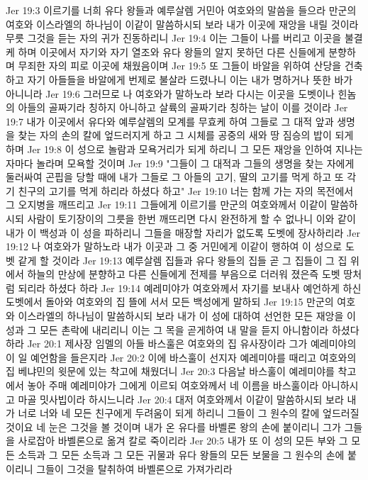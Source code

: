 Jer 19:3  이르기를 너희 유다 왕들과 예루살렘 거민아 여호와의 말씀을 들으라 만군의 여호와 이스라엘의 하나님이 이같이 말씀하시되 보라 내가 이곳에 재앙을 내릴 것이라 무릇 그것을 듣는 자의 귀가 진동하리니
Jer 19:4  이는 그들이 나를 버리고 이곳을 불결케 하며 이곳에서 자기와 자기 열조와 유다 왕들의 알지 못하던 다른 신들에게 분향하며 무죄한 자의 피로 이곳에 채웠음이며
Jer 19:5  또 그들이 바알을 위하여 산당을 건축하고 자기 아들들을 바알에게 번제로 불살라 드렸나니 이는 내가 명하거나 뜻한 바가 아니니라
Jer 19:6  그러므로 나 여호와가 말하노라 보라 다시는 이곳을 도벳이나 힌놈의 아들의 골짜기라 칭하지 아니하고 살륙의 골짜기라 칭하는 날이 이를 것이라
Jer 19:7  내가 이곳에서 유다와 예루살렘의 모계를 무효케 하여 그들로 그 대적 앞과 생명을 찾는 자의 손의 칼에 엎드러지게 하고 그 시체를 공중의 새와 땅 짐승의 밥이 되게 하며
Jer 19:8  이 성으로 놀람과 모욕거리가 되게 하리니 그 모든 재앙을 인하여 지나는 자마다 놀라며 모욕할 것이며
Jer 19:9  "그들이 그 대적과 그들의 생명을 찾는 자에게 둘러싸여 곤핍을 당할 때에 내가 그들로 그 아들의 고기, 딸의 고기를 먹게 하고 또 각기 친구의 고기를 먹게 하리라 하셨다 하고"
Jer 19:10  너는 함께 가는 자의 목전에서 그 오지병을 깨뜨리고
Jer 19:11  그들에게 이르기를 만군의 여호와께서 이같이 말씀하시되 사람이 토기장이의 그릇을 한번 깨뜨리면 다시 완전하게 할 수 없나니 이와 같이 내가 이 백성과 이 성을 파하리니 그들을 매장할 자리가 없도록 도벳에 장사하리라
Jer 19:12  나 여호와가 말하노라 내가 이곳과 그 중 거민에게 이같이 행하여 이 성으로 도벳 같게 할 것이라
Jer 19:13  예루살렘 집들과 유다 왕들의 집들 곧 그 집들이 그 집 위에서 하늘의 만상에 분향하고 다른 신들에게 전제를 부음으로 더러워 졌은즉 도벳 땅처럼 되리라 하셨다 하라
Jer 19:14  예레미야가 여호와께서 자기를 보내사 예언하게 하신 도벳에서 돌아와 여호와의 집 뜰에 서서 모든 백성에게 말하되
Jer 19:15  만군의 여호와 이스라엘의 하나님이 말씀하시되 보라 내가 이 성에 대하여 선언한 모든 재앙을 이 성과 그 모든 촌락에 내리리니 이는 그 목을 곧게하여 내 말을 듣지 아니함이라 하셨다 하라
Jer 20:1  제사장 임멜의 아들 바스훌은 여호와의 집 유사장이라 그가 예레미야의 이 일 예언함을 들은지라
Jer 20:2  이에 바스훌이 선지자 예레미야를 때리고 여호와의 집 베냐민의 윗문에 있는 착고에 채웠더니
Jer 20:3  다음날 바스훌이 예레미야를 착고에서 놓아 주매 예레미야가 그에게 이르되 여호와께서 네 이름을 바스훌이라 아니하시고 마골 밋사빕이라 하시느니라
Jer 20:4  대저 여호와께서 이같이 말씀하시되 보라 내가 너로 너와 네 모든 친구에게 두려움이 되게 하리니 그들이 그 원수의 칼에 엎드러질 것이요 네 눈은 그것을 볼 것이며 내가 온 유다를 바벨론 왕의 손에 붙이리니 그가 그들을 사로잡아 바벨론으로 옮겨 칼로 죽이리라
Jer 20:5  내가 또 이 성의 모든 부와 그 모든 소득과 그 모든 소득과 그 모든 귀물과 유다 왕들의 모든 보물을 그 원수의 손에 붙이리니 그들이 그것을 탈취하여 바벨론으로 가져가리라
